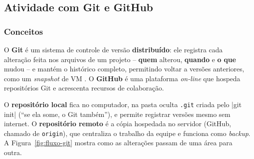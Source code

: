\subsection{Atividade com Git e GitHub}\label{sec:git}

\subsubsection{Conceitos}

O \textbf{Git} é um sistema de controle de versão \textbf{distribuído}: ele registra cada alteração
feita nos arquivos de um projeto -- \textbf{quem} alterou, \textbf{quando} e \textbf{o que} mudou --
e mantém o histórico completo, permitindo voltar a versões anteriores, como um \textit{snapshot} de
VM \citep{chacon2014,muniz2026}. O \textbf{GitHub} é uma plataforma \textit{on-line} que hospeda
repositórios Git e acrescenta recursos de colaboração.

O \textbf{repositório local} fica no computador, na pasta oculta \texttt{.git} criada pelo
\cod|git init| (``se ela some, o Git também''), e permite registrar versões mesmo sem internet. O
\textbf{repositório remoto} é a cópia hospedada no servidor (GitHub, chamado de \texttt{origin}), que
centraliza o trabalho da equipe e funciona como \textit{backup}. A Figura~\ref{fig:fluxo-git} mostra
como as alterações passam de uma área para outra.


